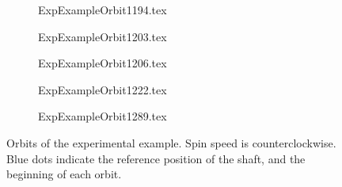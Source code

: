 \begin{figure}
\begin{subfigure}{.28\linewidth}
	\def\width{\linewidth}
	\centering
	{ExpExampleOrbit1194.tex}
	\label{fig:ExpExampleOrbit1194}
\end{subfigure}
\begin{subfigure}{.28\linewidth}
	\def\width{\linewidth}
	\centering
	{ExpExampleOrbit1203.tex}
	\label{fig:ExpExampleOrbit1203}
\end{subfigure}\vspace{-2em}
\begin{subfigure}{.28\linewidth}
	\def\width{\linewidth}
	\centering
	{ExpExampleOrbit1206.tex}
	\label{fig:ExpExampleOrbit1206}
\end{subfigure}
\begin{subfigure}{.5\linewidth}
	\def\width{.55\linewidth}
	\centering
	{ExpExampleOrbit1222.tex}
	\label{fig:ExpExampleOrbit1222}
\end{subfigure}
\begin{subfigure}{.5\linewidth}
	\def\width{.55\linewidth}
	\centering
	{ExpExampleOrbit1289.tex}
	\label{fig:ExpExampleOrbit1289}
\end{subfigure}
\caption{Orbits of the experimental example. Spin speed is counterclockwise. Blue dots indicate the reference position of the shaft, and the beginning of each orbit.}
\label{fig:ExpExampleOrbits}
\end{figure}

